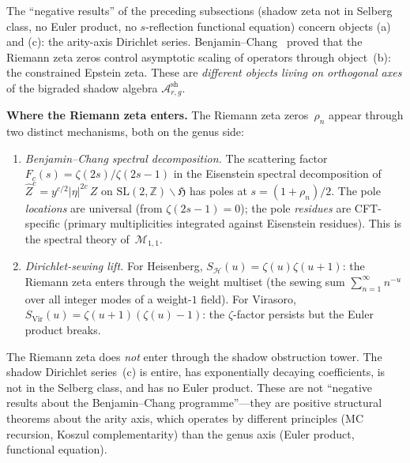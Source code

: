 \documentclass[11pt]{article}
\newcommand{\cA}{\mathcal{A}}
\newcommand{\cM}{\mathcal{M}}
\newcommand{\cH}{\mathcal{H}}
\newcommand{\Z}{\mathbb{Z}}
\begin{document}
The ``negative results'' of the preceding subsections
(shadow zeta not in Selberg class, no Euler product, no $s$-reflection
functional equation) concern objects (a) and (c): the arity-axis
Dirichlet series.  Benjamin--Chang~\cite{BenjaminChang22} proved
that the Riemann zeta zeros control asymptotic scaling of
operators through object~(b): the constrained Epstein zeta.
These are \emph{different objects living on orthogonal axes} of
the bigraded shadow algebra $\cA^{\mathrm{sh}}_{r,g}$.

\textbf{Where the Riemann zeta enters.}
The Riemann zeta zeros~$\rho_n$ appear through two distinct
mechanisms, both on the genus side:
\begin{enumerate}[label=\textup{(\roman*)}]
\item \emph{Benjamin--Chang spectral decomposition.}
  The scattering factor $F_c(s) = \zeta(2s)/\zeta(2s{-}1)$
  in the Eisenstein spectral decomposition of
  $\hat Z^c = y^{c/2}|\eta|^{2c}\,Z$ on
  $\mathrm{SL}(2,\Z)\backslash\mathfrak{H}$
  has poles at $s = (1 + \rho_n)/2$.  The pole
  \emph{locations} are universal (from $\zeta(2s{-}1) = 0$);
  the pole \emph{residues} are CFT-specific (primary
  multiplicities integrated against Eisenstein residues).
  This is the spectral theory of~$\cM_{1,1}$.

\item \emph{Dirichlet-sewing lift.}
  For Heisenberg, $S_\cH(u) = \zeta(u)\zeta(u{+}1)$:
  the Riemann zeta enters through the weight multiset
  (the sewing sum $\sum_{n=1}^\infty n^{-u}$ over all
  integer modes of a weight-$1$ field).  For Virasoro,
  $S_{\mathrm{Vir}}(u) = \zeta(u{+}1)(\zeta(u) - 1)$:
  the $\zeta$-factor persists but the Euler product breaks.
\end{enumerate}
The Riemann zeta does \emph{not} enter through the shadow
obstruction tower.  The shadow Dirichlet series~(c) is entire,
has exponentially decaying coefficients, is not in the Selberg
class, and has no Euler product.  These are not ``negative
results about the Benjamin--Chang programme''---they are positive
structural theorems about the arity axis, which operates by
different principles (MC recursion, Koszul complementarity)
than the genus axis (Euler product, functional equation).
\end{document}
